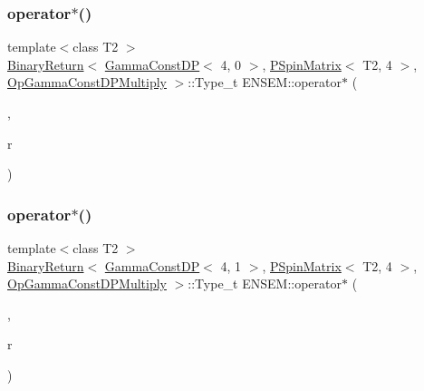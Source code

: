 \subsubsection{\texorpdfstring{operator$\ast$()}{operator*()}\hspace{0.1cm}{\footnotesize\ttfamily [33/64]}}
{\footnotesize\ttfamily template$<$class T2 $>$ \\
\mbox{\hyperlink{structENSEM_1_1BinaryReturn}{Binary\+Return}}$<$ \mbox{\hyperlink{classENSEM_1_1GammaConstDP}{Gamma\+Const\+DP}}$<$ 4, 0 $>$, \mbox{\hyperlink{classENSEM_1_1PSpinMatrix}{P\+Spin\+Matrix}}$<$ T2, 4 $>$, \mbox{\hyperlink{structENSEM_1_1OpGammaConstDPMultiply}{Op\+Gamma\+Const\+D\+P\+Multiply}} $>$\+::Type\+\_\+t E\+N\+S\+E\+M\+::operator$\ast$ (\begin{DoxyParamCaption}\item[{const \mbox{\hyperlink{classENSEM_1_1GammaConstDP}{Gamma\+Const\+DP}}$<$ 4, 0 $>$ \&}]{,  }\item[{const \mbox{\hyperlink{classENSEM_1_1PSpinMatrix}{P\+Spin\+Matrix}}$<$ T2, 4 $>$ \&}]{r }\end{DoxyParamCaption})\hspace{0.3cm}{\ttfamily [inline]}}

\mbox{\label{group__primspinmatrix_gaa16aa59946d908b7254dc099e2518fc0}} 
\subsubsection{\texorpdfstring{operator$\ast$()}{operator*()}\hspace{0.1cm}{\footnotesize\ttfamily [34/64]}}
{\footnotesize\ttfamily template$<$class T2 $>$ \\
\mbox{\hyperlink{structENSEM_1_1BinaryReturn}{Binary\+Return}}$<$ \mbox{\hyperlink{classENSEM_1_1GammaConstDP}{Gamma\+Const\+DP}}$<$ 4, 1 $>$, \mbox{\hyperlink{classENSEM_1_1PSpinMatrix}{P\+Spin\+Matrix}}$<$ T2, 4 $>$, \mbox{\hyperlink{structENSEM_1_1OpGammaConstDPMultiply}{Op\+Gamma\+Const\+D\+P\+Multiply}} $>$\+::Type\+\_\+t E\+N\+S\+E\+M\+::operator$\ast$ (\begin{DoxyParamCaption}\item[{const \mbox{\hyperlink{classENSEM_1_1GammaConstDP}{Gamma\+Const\+DP}}$<$ 4, 1 $>$ \&}]{,  }\item[{const \mbox{\hyperlink{classENSEM_1_1PSpinMatrix}{P\+Spin\+Matrix}}$<$ T2, 4 $>$ \&}]{r }\end{DoxyParamCaption})\hspace{0.3cm}{\ttfamily [inline]}}

